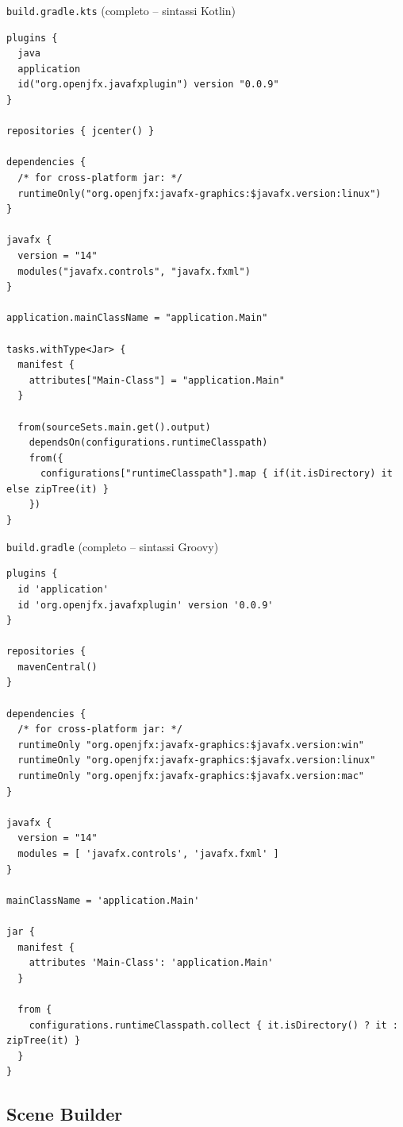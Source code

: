 \documentclass[presentation]{beamer}
\begin{document}
\begin{frame}[fragile]{\texttt{build.gradle.kts} (completo -- sintassi Kotlin)}
\begin{lstlisting}[basicstyle=\tiny]
plugins {
  java
  application
  id("org.openjfx.javafxplugin") version "0.0.9"
}

repositories { jcenter() }

dependencies {
  /* for cross-platform jar: */
  runtimeOnly("org.openjfx:javafx-graphics:$javafx.version:linux")
}

javafx {
  version = "14"
  modules("javafx.controls", "javafx.fxml")
}

application.mainClassName = "application.Main"

tasks.withType<Jar> {
  manifest {
    attributes["Main-Class"] = "application.Main"
  }

  from(sourceSets.main.get().output)
    dependsOn(configurations.runtimeClasspath)
    from({
      configurations["runtimeClasspath"].map { if(it.isDirectory) it else zipTree(it) }
    })
}
\end{lstlisting}
\end{frame}


\begin{frame}[fragile]{\texttt{build.gradle} (completo -- sintassi Groovy)}
\begin{lstlisting}[basicstyle=\tiny]
plugins {
  id 'application'
  id 'org.openjfx.javafxplugin' version '0.0.9'
}

repositories {
  mavenCentral()
}

dependencies {
  /* for cross-platform jar: */
  runtimeOnly "org.openjfx:javafx-graphics:$javafx.version:win"
  runtimeOnly "org.openjfx:javafx-graphics:$javafx.version:linux"
  runtimeOnly "org.openjfx:javafx-graphics:$javafx.version:mac"
}

javafx {
  version = "14"
  modules = [ 'javafx.controls', 'javafx.fxml' ]
}

mainClassName = 'application.Main'

jar {
  manifest {
    attributes 'Main-Class': 'application.Main'
  }

  from {
    configurations.runtimeClasspath.collect { it.isDirectory() ? it : zipTree(it) }
  }
}
\end{lstlisting}
\end{frame}


\subsection{Scene Builder}
\end{document}
